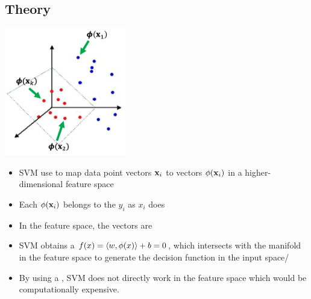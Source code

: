 \documentclass{tron}
\begin{document}
\subsection{Theory}
\begin{remark}{}
	\includegraphics[width=200px]{Figs/slide8/svm-basic}
	
	\begin{itemize}
		\item SVM use  to map data point vectors $\mathbf{x}_i$ to vectors $\phi (\mathbf{x}_i)$ in a higher-dimensional feature space
		\item Each $\phi (\mathbf{x}_i)$ belongs to the  $y_i$ as $x_i$ does
		\item In the feature space, the vectors are 
		\item SVM obtains a  $f(x) = \langle w, \phi(x) \rangle + b = 0$, which intersects with the manifold in the feature space to generate the decision function in the input space/
		\item By using a , SVM does not directly work in the feature space which would be computationally expensive.
	\end{itemize}
\end{remark}

\clearpage
\end{document}
